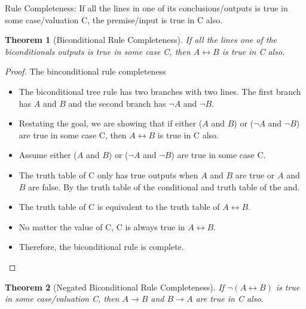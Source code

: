 \documentclass[12pt]{article}
\newtheorem{theorem}{Theorem}
\begin{document}
Rule Completeness:  If all the lines in one of its conclusions/outputs  is true in some case/valuation C, the premise/input is true in C also.


\begin{theorem}[Biconditional Rule Completeness]
    If all the lines one of the biconditionals outputs is true in some case C, then $A \leftrightarrow B$ is true in C also.
\end{theorem}

\begin{proof} The binconditional rule completeness
    \begin{itemize}
        \item The biconditional tree rule has two branches with two lines. The first branch has $A$ and $B$ and the second branch has $\neg A$ and $\neg B$. 
        \item Restating the goal, we are showing that if either ($A$ and $B$) or ($\neg A$ and $\neg B$) are true in some case C, then $A \leftrightarrow B$ is true in C also.
        \item Assume either ($A$ and $B$) or ($\neg A$ and $\neg B$) are true in some case C.
        \item The truth table of C only has true outputs when $A$ and $B$ are true or $A$ and $B$ are false. By the truth table of the conditional and truth table of the and. 
        \item The truth table of C is equivalent to the truth table of $A \leftrightarrow B$.
        \item No matter the value of C, C is always true in $A \leftrightarrow B$.
        \item Therefore, the biconditional rule is complete.
    \end{itemize}
\end{proof}

\begin{theorem}[Negated Biconditional Rule Completeness]
    If $\neg (A \leftrightarrow B)$ is true in some case/valuation C, then $A \rightarrow B$ and $B \rightarrow A$ are true in C also.
\end{theorem}
\end{document}
